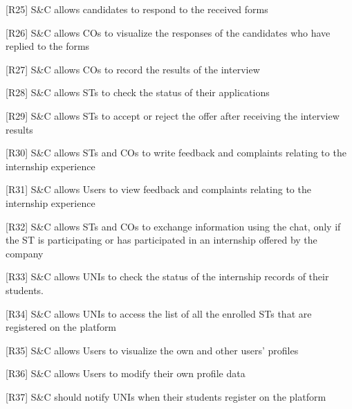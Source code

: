 [R25] S\&C allows candidates to respond to the received forms

[R26] S\&C allows COs to visualize the responses of the candidates who have replied to the forms

[R27] S\&C allows COs to record the results of the interview

[R28] S\&C allows STs to check the status of their applications

[R29] S\&C allows STs to accept or reject the offer after receiving the interview results

[R30] S\&C allows STs and COs to write feedback and complaints relating to the internship experience

[R31] S\&C allows Users to view feedback and complaints relating to the internship experience

[R32] S\&C allows STs and COs to exchange information using the chat, only if the ST is participating or has participated in an internship offered by the company

[R33] S\&C allows UNIs to check the status of the internship records of their students.

[R34] S\&C allows UNIs to access the list of all the enrolled STs that are registered on the platform

[R35] S\&C allows Users to visualize the own and other users' profiles

[R36] S\&C allows Users to modify their own profile data

[R37] S\&C should notify UNIs when their students register on the platform


